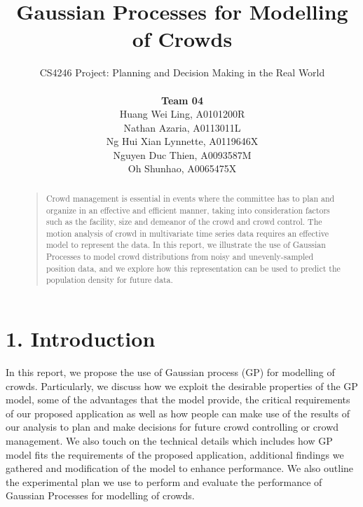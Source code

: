 \documentclass[letterpaper]{article}
\begin{document}
%
\title{Gaussian Processes for Modelling of Crowds}
\author{CS4246 Project: Planning and Decision Making in the Real World  \\ \\
{\bf Team 04} \\
Huang Wei Ling, A0101200R\\
Nathan Azaria, A0113011L\\
Ng Hui Xian Lynnette, A0119646X\\
Nguyen Duc Thien, A0093587M\\
Oh Shunhao, A0065475X\\
}
\maketitle
\begin{abstract}
\begin{quote}
Crowd management is essential in events where the committee has to plan and organize in an effective and efficient manner, taking into consideration factors such as the facility, size and demeanor of the crowd and crowd control. The motion analysis of crowd in multivariate time series data requires an effective model to represent the data. In this report, we illustrate the use of Gaussian Processes to model crowd distributions from noisy and unevenly-sampled position data, and we explore how this representation can be used to predict the population density for future data.
\end{quote}
\end{abstract}

\section{1.  Introduction}
In this report, we propose the use of Gaussian process (GP) for modelling of crowds. Particularly, we discuss how we exploit the desirable properties of the GP model, some of the advantages that the model provide, the critical requirements of our proposed application as well as how people can make use of the results of our analysis to plan and make decisions for future crowd controlling or crowd management. We also touch on the technical details which includes how GP model fits the requirements of the proposed application, additional findings we gathered and modification of the model to enhance performance. We also outline the experimental plan we use to perform and evaluate the performance of Gaussian Processes for modelling of crowds. \\
\end{document}
